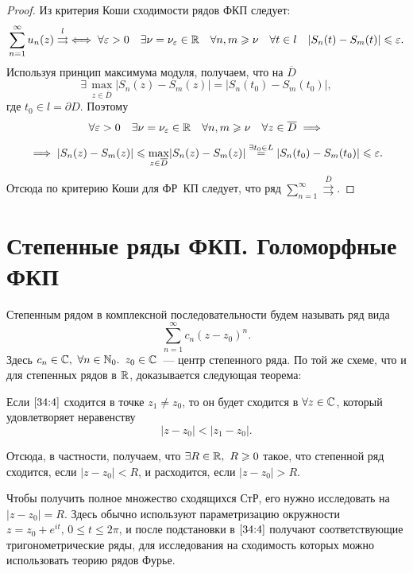 \documentclass[../../main.tex]{subfiles}
\begin{document}
\begin{proof}
	Из критерия Коши сходимости рядов ФКП следует:
	\[ \sum\limits_{n = 1}^{\infty} u_n(z) \overset{l}\rightrightarrows \iff 
	\forall \varepsilon > 0\quad \exists \nu = \nu_\varepsilon \in \mathbb{R} \quad \forall n, m 
	\geqslant \nu \quad \forall t \in l \quad |S_n(t) - S_m(t)| \leqslant \varepsilon. \]
	Используя принцип максимума модуля, получаем, что на $ \overline{D} $ 
	\[\exists\, \underset{z \in \overline{D}}{\max}|S_n(z) - S_m(z)| = |S_n(t_0) - S_m(t_0)| ,\] 
	где $ t_0 \in l = \partial D $.
	Поэтому \[ \forall \varepsilon > 0\quad \exists \nu = \nu_\varepsilon \in \mathbb{R} \quad \forall 
	n, m \geqslant \nu \quad \forall z \in \overline{D} \implies\]
	\[\implies |S_n(z) - S_m(z)| 
	\leqslant \underset{z \in \overline{D}}{\max}|S_n(z) - S_m(z)| \overset{\exists t_0 \in L}= 
	|S_n(t_0) - S_m(t_0)| \leqslant \varepsilon.\]
	Отсюда по критерию Коши для ФР~КП следует, что ряд $ \sum\limits_{n = 
	1}^{\infty} \overset{\overline{D}}\rightrightarrows $.
\end{proof}

\section{Степенные ряды ФКП. Голоморфные ФКП}

Степенным рядом в комплексной последовательности будем называть ряд вида
\begin{equation}\label{34:4}
	\sum\limits_{n = 1}^{\infty} c_n (z - z_0)^n.
\end{equation}
Здесь $ c_n \in \mathbb{C},\ \forall n \in \mathbb{N}_0.$ $z_0 \in \mathbb{C} $~--- центр 
степенного ряда. По той же схеме, что и для степенных рядов в $ \mathbb{R} $, 
доказывается следующая теорема:
\begin{thm}
	Если $ \eqref{34:4} $ сходится в точке $ z_1 \neq z_0 $, то он будет сходится в
	$ \forall z \in \mathbb{C} $, который удовлетворяет неравенству
	\[ |z - z_0| < |z_1 - z_0|. \]
\end{thm}

Отсюда, в частности, получаем, что $ \exists R \in \mathbb{R},\ R \geqslant 0$ такое, 
что степенной ряд сходится, если $ |z - z_0| < R $, и расходится, если
$ |z - z_0| > R $.

Чтобы получить полное множество сходящихся СтР, его нужно исследовать на
${|z - z_0| = R}$. Здесь обычно используют параметризацию окружности
$ z = z_0 + e^{it},\, 0 \leq t \leq 2\pi $, и после подстановки в $ \eqref{34:4} $ получают 
соответствующие тригонометрические ряды, для исследования на сходимость 
которых можно использовать теорию рядов Фурье.
\end{document}
